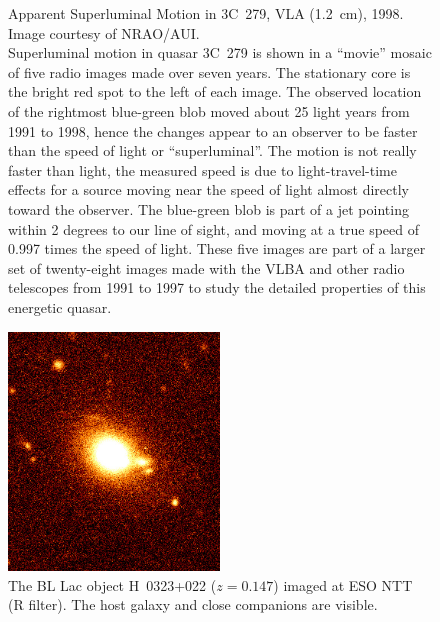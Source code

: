 \documentclass[10pt,a4paper,english]{article}
\begin{document}
\begin{figure}[!ht]
\begin{minipage}{.4\textwidth}
{            Apparent Superluminal Motion in 3C~279, VLA (\SI{1.2}{\cm}), 1998.
            Image courtesy of NRAO/AUI.\vspace{1ex}\\
            Superluminal motion in quasar 3C~279 is shown in a “movie” mosaic of
            five radio images made over seven years. The stationary core is the
            bright red spot to the left of each image. The observed location of
            the rightmost blue-green blob moved about 25 light years from 1991
            to 1998, hence the changes appear to an observer to be faster than
            the speed of light or “superluminal”. The motion is not really
            faster than light, the measured speed is due to light-travel-time
            effects for a source moving near the speed of light almost directly
            toward the observer. The blue-green blob is part of a jet pointing
            within 2 degrees to our line of sight, and moving at a true speed
            of 0.997 times the speed of light. These five images are part of a
            larger set of twenty-eight images made with the VLBA and other
            radio telescopes from 1991 to 1997 to study the detailed properties
            of this energetic quasar.
        }
    \end{minipage}
\end{figure}

\begin{figure}[!ht]
    \centering
    \includegraphics[width=0.5\textwidth]{H0323bl2.jpg}
    \caption{
        The BL Lac object H~0323+022 ($z=0.147$) imaged at ESO NTT (R
        filter). The host galaxy and close companions are visible.
    }
\end{figure}
\end{document}

